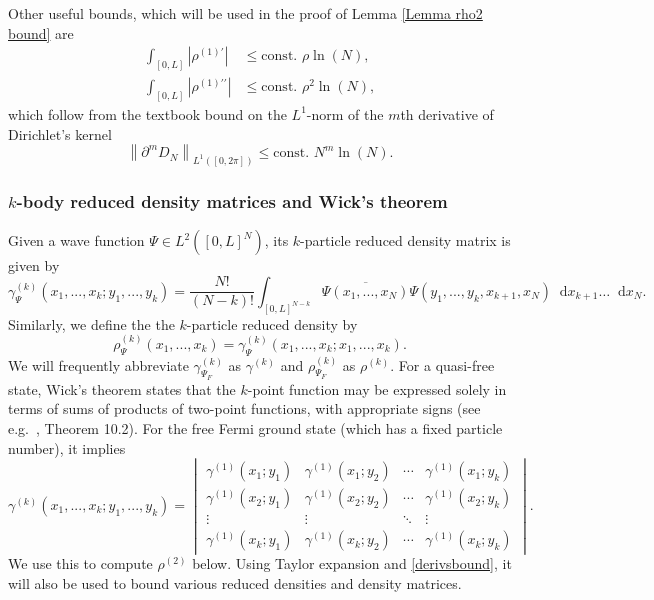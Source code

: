 \documentclass[a4paper,11pt]{article}
\newcommand{\norm}[1]{\left\lVert #1 \right\rVert}
\newcommand{\abs}[1]{\left\lvert #1 \right\rvert}
\newcommand*\diff{\mathop{}\!\mathrm{d}}
\numberwithin{equation}{section}
\begin{document}
 Other useful bounds, which will be used in the proof of Lemma \ref{Lemma rho2 bound} are
 \begin{equation}\label{EqDirichletKernelDerivativeBound}
     \begin{aligned}
         \int_{[0,L]}\abs{\rho^{(1)\prime}}&\leq \text{const. }\rho\ln(N),\\
         \int_{[0,L]}\abs{\rho^{(1)\prime\prime}}&\leq \text{const. }\rho^2\ln(N),
     \end{aligned}
 \end{equation}
which follow from the textbook bound on the $L^1$-norm of the $m$th derivative of Dirichlet's kernel $$ \norm{\partial^mD_N}_{L^1([0,2\pi])}\leq \text{const. }N^{m}\ln(N). $$
 
 \subsubsection{$k$-body reduced density matrices and Wick's theorem}
 Given a wave function $\Psi\in L^2([0,L]^N)$, its $k$-particle reduced density matrix is given by\begin{equation}
     \gamma_{\Psi}^{(k)}(x_1,...,x_k;y_1,...,y_k)=\frac{N!}{(N-k)!}\int_{[0,L]^{N-k}}\overline{\Psi(x_1,...,x_N)}\Psi(y_1,...,y_k,x_{k+1},x_N)\diff x_{k+1}\ldots\diff x_N.
 \end{equation}
 Similarly, we define the the $k$-particle reduced density by\begin{equation}
     \rho_{\Psi}^{(k)}(x_1,...,x_k)=\gamma_{\Psi}^{(k)}(x_1,...,x_k;x_1,...,x_k).
 \end{equation}
 We will frequently abbreviate $\gamma_{\Psi_F}^{(k)}$ as $\gamma^{(k)}$ and $\rho_{\Psi_F}^{(k)}$ as $\rho^{(k)}$.
 For a quasi-free state, Wick's theorem states that the $k$-point function may be expressed solely in terms of sums of products of two-point functions, with appropriate signs (see e.g.\ \cite{solovej2007many}, Theorem 10.2). For the free Fermi ground state (which has a fixed particle number), it implies
 \begin{equation}
 \label{Wickexpression}
    \gamma^{(k)}(x_1,...,x_k;y_1,...,y_k) =\begin{vmatrix}
        \gamma^{(1)}(x_1;y_1)&\gamma^{(1)}(x_1;y_2)&\cdots&\gamma^{(1)}(x_1;y_k)\\
        \gamma^{(1)}(x_2;y_1)&\gamma^{(1)}(x_2;y_2)&\cdots&\gamma^{(1)}(x_2;y_k)\\
        \vdots&\vdots &\ddots&\vdots\\
        \gamma^{(1)}(x_k;y_1)&\gamma^{(1)}(x_k;y_2)&\cdots&\gamma^{(1)}(x_k;y_k)
    \end{vmatrix}.
 \end{equation}
 We use this to compute $\rho^{(2)}$ below. Using Taylor expansion and \eqref{derivsbound}, it will also be used to bound various reduced densities and density matrices.
\end{document}

